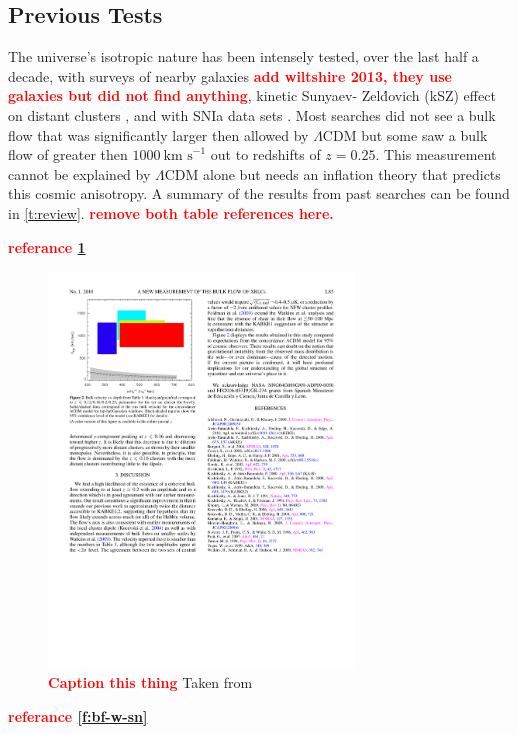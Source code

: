 \documentclass[apj, iop]{emulateapj}
\newcommand{\sn}{SNIa}
\newcommand{\todo}[1]{\textbf{\textcolor{red}{#1}}}
\newcommand{\lcdm}{$\Lambda$CDM}     %
\newcommand{\kms}{\ensuremath{~\text{km s}^{-1}}}
\begin{document}
\subsection{Previous Tests}\label{previous-tests}

The universe's isotropic nature has been intensely tested, over the last half a
decade, with surveys of nearby galaxies \citep{Ma13}\todo{add wiltshire 2013,
they use galaxies but did not find anything}, kinetic Sunyaev- Zel\'{d}ovich
(kSZ) effect on distant clusters \citep{Kashlinsky10,Planckdf}, and with \sn{}
data sets \citep[and others as seen in ]{Dai11,Rathaus13}. Most
searches did not see a bulk flow that was significantly larger then allowed by
\lcdm{} but some saw a bulk flow of greater then $1000 \kms{}$ out to redshifts
of $z = 0.25$. This measurement cannot be explained by $\Lambda$CDM alone but
needs an inflation theory that predicts this cosmic anisotropy.  A summary of
the results from past searches can be found in \cref{t:review}. \todo{remove
both table references here.}

\todo{referance \cref{f:ksz}}

\begin{figure}
	\includegraphics[width=3.2in]{Kashlinsky2010.pdf} 
    \caption{\todo{Caption this thing} 
    Taken from \cite{Kashlinsky10}}
	\label{f:ksz} 
\end{figure}

\todo{referance \cref{f:bf-w-sn}}
\end{document}
